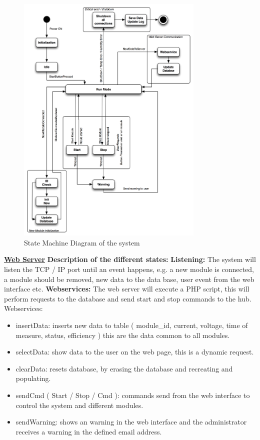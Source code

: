 	\begin{figure}[H]
		\begin{centering}
			 \includegraphics[width=0.8\textwidth]{images/statemachine.png}
		\caption{State Machine Diagram of the system}
	 	\end{centering}
	\end{figure}
	
\underline{\textbf{Web Server\:}}
\p \textbf{Description of the different states: }
	\textbf{Listening: }The system will listen the TCP / IP port until an event happens, e.g.  a new module is connected, a module should be removed, new data to the data base, user event from the web interface etc.
	\textbf{Webservices:} The web server will execute a PHP script, this will perform requests to the database and send start and stop commands to the hub.
	\p
	Webservices:
	\begin{itemize}
		\item insertData: inserts new data to table ( module\_id, current, voltage, time of measure, status, efficiency  ) this are the data common to all modules.
		\item selectData: show data to the user on the web page, this is a dynamic request.
		\item clearData: resets database, by erasing the database and recreating and populating.
		\item sendCmd ( Start / Stop / Cmd ): commands send from the web interface to control the system and different modules.
		\item sendWarning: shows an warning in the web interface and the administrator receives a warning in the defined email address.
	\end{itemize}

